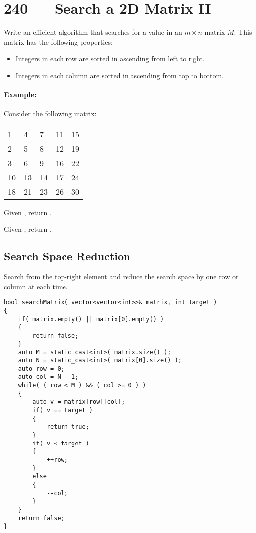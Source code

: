 \section{240 --- Search a 2D Matrix II}
Write an efficient algorithm that searches for a value in an $m \times n$ matrix $M$. This matrix has the following properties:
\begin{itemize}
\item Integers in each row are sorted in ascending from left to right.
\item Integers in each column are sorted in ascending from top to bottom.
\end{itemize}

\paragraph{Example:}
\begin{flushleft}
Consider the following matrix:

\begin{table}[H]
\begin{tabular}{lllll}
1  & 4  & 7  & 11 & 15 \\
2  & 5  & 8  & 12 & 19 \\
3  & 6  & 9  & 16 & 22 \\
10 & 13 & 14 & 17 & 24 \\
18 & 21 & 23 & 26 & 30
\end{tabular}
\end{table}
Given , return .

Given , return .
\end{flushleft}

\subsection{Search Space Reduction}
Search from the top-right element and reduce the search space by one row or column at each time.

\setcounter{lstlisting}{0}
\begin{lstlisting}[style=customc, caption={Search Space Reduction}]
bool searchMatrix( vector<vector<int>>& matrix, int target )
{
    if( matrix.empty() || matrix[0].empty() )
    {
        return false;
    }
    auto M = static_cast<int>( matrix.size() );
    auto N = static_cast<int>( matrix[0].size() );
    auto row = 0;
    auto col = N - 1;
    while( ( row < M ) && ( col >= 0 ) )
    {
        auto v = matrix[row][col];
        if( v == target )
        {
            return true;
        }
        if( v < target )
        {
            ++row;
        }
        else
        {
            --col;
        }
    }
    return false;
}
\end{lstlisting}